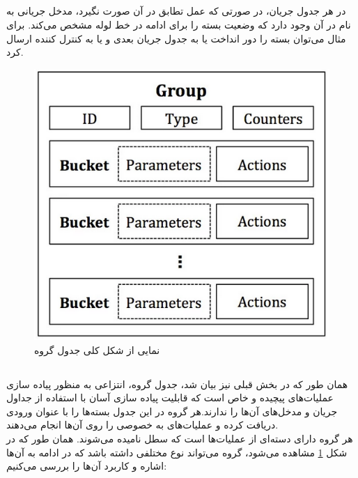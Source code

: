 \subsection{}
در هر جدول جریان، در صورتی که عمل تطابق در آن صورت نگیرد، مدخل جریانی به نام  در آن وجود دارد که وضعیت بسته را برای ادامه در خط لوله مشخص می‌کند. برای مثال می‌توان بسته را دور انداخت یا به جدول جریان بعدی و یا به کنترل کننده ارسال کرد.\\

\begin{figure}
	\centering
	\includegraphics[scale=0.5]{imgs/group_fig.png}
	\caption{نمایی از شکل کلی جدول گروه}
	\label{fig6}
\end{figure}

\subsection{}
همان طور که در بخش قبلی نیز بیان شد، جدول گروه، انتزاعی به منظور پیاده سازی عملیات‌های پیچیده و خاص است که قابلیت پیاده سازی آسان با استفاده از جداول جریان و مدخل‌های آن‌ها را ندارند.هر گروه در این جدول بسته‌ها را با عنوان ورودی دریافت کرده و عملیات‌های به خصوصی را روی آن‌ها انجام می‌دهند.\\
هر گروه دارای دسته‌ای از عملیات‌ها است که سطل نامیده می‌شوند. همان طور که در شکل \ref{fig6} مشاهده می‌شود، گروه می‌تواند نوع مختلفی داشته باشد که در ادامه به آن‌ها اشاره و کاربرد آن‌ها را بررسی می‌کنیم:

